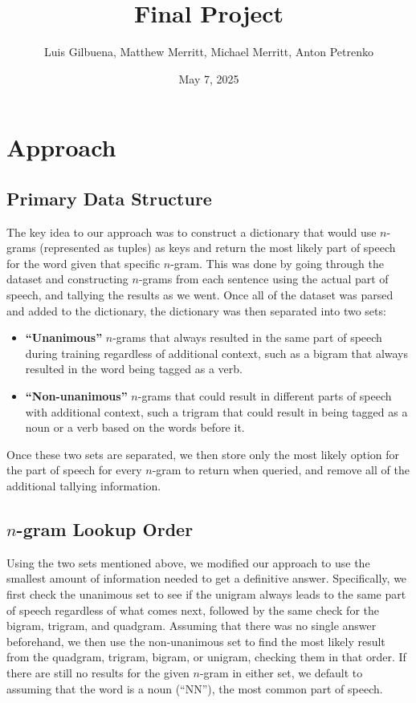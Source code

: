 \documentclass{article}
\title{Final Project}
\author{Luis Gilbuena, Matthew Merritt, Michael Merritt, Anton Petrenko}
\date{May 7, 2025}
\begin{document}
\maketitle

\section{Approach}

\subsection{Primary Data Structure}

The key idea to our approach was to construct a dictionary that would use $n$-grams (represented as tuples) as keys and return the most likely part of speech for the word given
that specific $n$-gram. This was done by going through the dataset and constructing $n$-grams from each sentence using the actual part of speech, and tallying the results as we
went. Once all of the dataset was parsed and added to the dictionary, the dictionary was then separated into two sets: 
\begin{itemize}
    \item \textbf{``Unanimous''} $n$-grams that always resulted in the same part of speech during training regardless of additional context, such as a bigram that always 
    resulted in the word being tagged as a verb.
    \item \textbf{``Non-unanimous''} $n$-grams that could result in different parts of speech with additional context, such a trigram that could result in being tagged as a noun
    or a verb based on the words before it.
\end{itemize}
Once these two sets are separated, we then store only the most likely option for the part of speech for every $n$-gram to return when queried, and remove all of the additional 
tallying information.

\subsection{$n$-gram Lookup Order}

Using the two sets mentioned above, we modified our approach to use the smallest amount of information needed to get a definitive answer.
Specifically, we first check the unanimous set to see if the unigram always leads to the same part of speech regardless of what comes next, followed by the same check for the 
bigram, trigram, and quadgram. Assuming that there was no single answer beforehand, we then use the non-unanimous set to find the most likely result from the quadgram, trigram, 
bigram, or unigram, checking them in that order. If there are still no results for the given $n$-gram in either set, we default to assuming that the word is a noun (``NN''), 
the most common part of speech.
\end{document}
